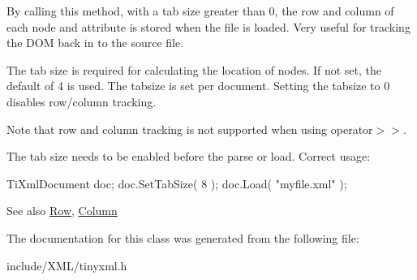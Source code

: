 By calling this method, with a tab size greater than 0, the row and column of each node and attribute is stored when the file is loaded. Very useful for tracking the DOM back in to the source file.

The tab size is required for calculating the location of nodes. If not set, the default of 4 is used. The tabsize is set per document. Setting the tabsize to 0 disables row/column tracking.

Note that row and column tracking is not supported when using operator$>$$>$.

The tab size needs to be enabled before the parse or load. Correct usage: \begin{DoxyVerb}
		TiXmlDocument doc;
		doc.SetTabSize( 8 );
		doc.Load( "myfile.xml" );
		\end{DoxyVerb}


\begin{DoxySeeAlso}{See also}
\hyperlink{class_ti_xml_base_a024bceb070188df92c2a8d8852dd0853}{Row}, \hyperlink{class_ti_xml_base_ab54bfb9b70fe6dd276e7b279cab7f003}{Column} 
\end{DoxySeeAlso}


The documentation for this class was generated from the following file:\begin{DoxyCompactItemize}
\item 
include/XML/tinyxml.h\end{DoxyCompactItemize}
